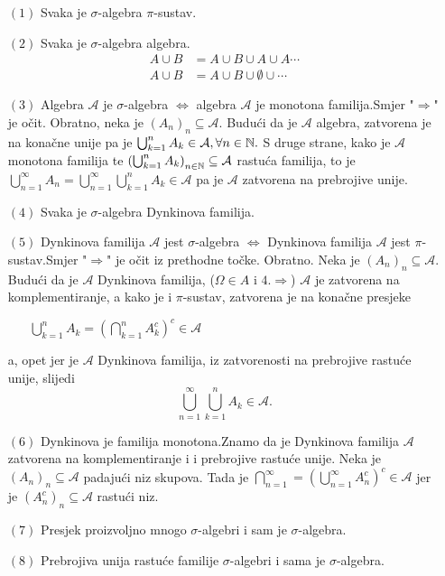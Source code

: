 \documentclass{article}
\begin{document}
\begin{enumerate}
    \item[\((1)\)] Svaka je \(\sigma\)-algebra \(\pi\)-sustav.
    \item[\((2)\)] Svaka je \(\sigma\)-algebra algebra. \newline \[\begin{aligned}A\cup B&=A\cup B\cup A\cup A\cdots\\A\cup B&=A\cup B\cup\emptyset\cup\cdots\end{aligned}\]
    \item[\((3)\)] Algebra \(\mathcal A\) je \(\sigma\)-algebra \(\Leftrightarrow\) algebra \(\mathcal A\) je monotona familija.\newline Smjer "\(\Rightarrow\)" je očit. Obratno, neka je \((A_n)_n\subseteq\mathcal A.\) Budući da je \(\mathcal A\) algebra, zatvorena je na konačne unije pa je \(\bigcup_{k=1}^nA_k\in\mathcal A,\forall n\in\Bbb N.\) S druge strane, kako je \(\mathcal A\) monotona familija te \(\left(\bigcup_{k=1}^nA_k\right)_{n\in\Bbb N}\subseteq\mathcal A\) rastuća familija, to je \(\bigcup_{n=1}^\infty A_n=\bigcup_{n=1}^\infty\bigcup_{k=1}^nA_k\in\mathcal A\) pa je \(\mathcal A\) zatvorena na prebrojive unije.
    \item[\((4)\)] Svaka je \(\sigma\)-algebra Dynkinova familija.
    \item[\((5)\)] Dynkinova familija \(\mathcal A\) jest \(\sigma\)-algebra \(\Leftrightarrow\) Dynkinova familija \(\mathcal A\) jest \(\pi\)-sustav.\newline Smjer "\(\Rightarrow\)" je očit iz prethodne točke. Obratno. Neka je \((A_n)_n\subseteq\mathcal A.\) Budući da je \(\mathcal A\) Dynkinova familija, (\(\Omega\in A\) i \(4.\Rightarrow\)) \(\mathcal A\) je zatvorena na komplementiranje, a kako je i \(\pi\)-sustav, zatvorena je na konačne presjeke\begin{itemize}
        \item[\ding{228}] \(\bigcup_{k=1}^n A_k=\left(\bigcap_{k=1}^nA_k^c\right)^c\in\mathcal A\)
    \end{itemize} a, opet jer je \(\mathcal A\) Dynkinova familija, iz zatvorenosti na prebrojive rastuće unije, slijedi \[\bigcup_{n=1}^\infty\bigcup_{k=1}^nA_k\in\mathcal A.\] 
    \item[\((6)\)] Dynkinova je familija monotona.\newline Znamo da je Dynkinova familija \(\mathcal A\) zatvorena na komplementiranje i i prebrojive rastuće unije. Neka je \((A_n)_n\subseteq\mathcal A\) padajući niz skupova. Tada je \(\bigcap_{n=1}^\infty=\left(\bigcup_{n=1}^\infty A_n^c\right)^c\in\mathcal A\) jer je \((A_n^c)_n\subseteq\mathcal A\) rastući niz. 
    \item[\((7)\)] Presjek proizvoljno mnogo \(\sigma\)-algebri i sam je \(\sigma\)-algebra.
    \item[\((8)\)] Prebrojiva unija rastuće familije \(\sigma\)-algebri i sama je \(\sigma\)-algebra.
\end{enumerate}
\newpage
\end{document}
